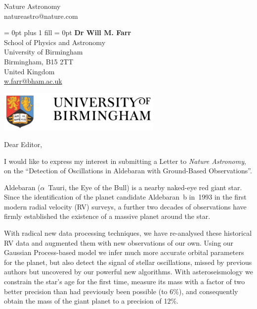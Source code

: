 \documentclass[11pt]{letter} %
\begin{document}
%
\longindentation=0pt                       %
\let\raggedleft\raggedright                %

\nopagebreak  
\begin{letter}
{Nature Astronomy \\
natureastro@nature.com \\}
      
{
\leftskip = 0pt plus 1 fill
\rightskip = 0pt
\parindent 0pt
%
%
{{\bf Dr Will M. Farr}} \\
School of Physics and Astronomy\\
University of Birmingham\\
Birmingham, B15 2TT\\
United Kingdom\\
 \url{w.farr@bham.ac.uk} \\
 
}


\begin{minipage}[c]{5in}\vskip-4.25cm
\begin{flushleft}
	\begin{minipage}[c]{3cm}
		\begin{flushleft}
			\includegraphics*[width=8cm]{birmingham_logo.png}%
		\end{flushleft}
	\end{minipage}
\end{flushleft}
\end{minipage}

\opening{Dear Editor,} 
 
\noindent I would like to express my interest in submitting a Letter to \emph{Nature Astronomy}, on the ``Detection of Oscillations in Aldebaran with Ground-Based Observations''.

Aldebaran ($\alpha$~Tauri, the Eye of the Bull) is a nearby naked-eye red giant star. Since the identification of the planet candidate Aldebaran~b in~1993 in the first modern radial velocity (RV) surveys, a further two decades of observations have firmly established the existence of a massive planet around the star. 

With radical new data processing techniques, we have re-analysed these historical RV data and augmented them with new observations of our own. Using our Gaussian Process-based model we infer much more accurate orbital parameters for the planet, but also detect the signal of stellar oscillations, missed by previous authors but uncovered by our powerful new algorithms. With asteroseismology we constrain the star's age for the first time, measure its mass with a factor of two better precision than had previously been possible (to 6\%), and consequently obtain the mass of the giant planet to a precision of 12\%.


\end{letter}
\end{document}
